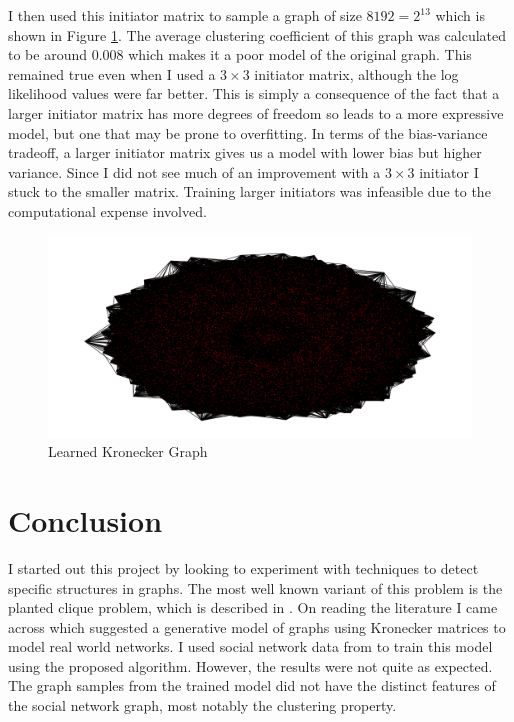 \documentclass[dvips,12pt]{article}
\begin{document}
I then used this initiator matrix to sample a graph of size $8192 = 2^{13}$ which is shown in Figure \ref{kron}. The average clustering coefficient of this graph was calculated to be around 0.008 which makes it a poor model of the original graph. This remained true even when I used a $3 \times 3$ initiator matrix, although the log likelihood values were far better. This is simply a consequence of the fact that a larger initiator matrix has more degrees of freedom so leads to a more expressive model, but one that may be prone to overfitting. In terms of the bias-variance tradeoff, a larger initiator matrix gives us a model with lower bias but higher variance. Since I did not see much of an improvement with a $3 \times 3$ initiator I stuck to the smaller matrix. Training larger initiators was infeasible due to the computational expense involved.

\begin{figure}[!htb]
\centering
\includegraphics[scale=0.3]{kronecker_graph_P2}
\caption{Learned Kronecker Graph}
\label{kron}
\end{figure}


\section{Conclusion}

I started out this project by looking to experiment with techniques to detect specific structures in graphs. The most well known variant of this problem is the planted clique problem, which is described in \cite{cook2015}. On reading the literature I came across \cite{ghahramani2010} which suggested a generative model of graphs using Kronecker matrices to model real world networks. I used social network data from \cite{SNAP-dataset} to train this model using the proposed algorithm. However, the results were not quite as expected. The graph samples from the trained model did not have the distinct features of the social network graph, most notably the clustering property.
\end{document}

